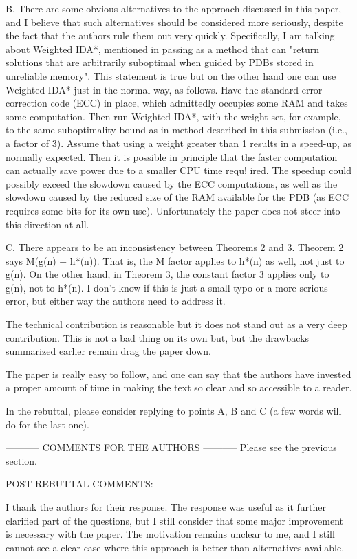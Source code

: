 B. There are some obvious alternatives to the approach discussed in this paper, and I believe that such alternatives should be considered more seriously, despite the fact that the authors rule them out very quickly. Specifically, I am talking about Weighted IDA*, mentioned in passing as a method that can "return solutions that are arbitrarily suboptimal when guided by PDBs stored in unreliable memory". This statement is true but on the other hand one can use Weighted IDA* just in the normal way, as follows. Have the standard error-correction code (ECC) in place, which admittedly occupies some RAM and takes some computation. Then run Weighted IDA*, with the weight set, for example, to the same suboptimality bound as in method described in this submission (i.e., a factor of 3). Assume that using a weight greater than 1 results in a speed-up, as normally expected. Then it is possible in principle that the faster computation can actually save power due to a smaller CPU time requ!
 ired. The speedup could possibly exceed the slowdown caused by the ECC computations, as well as the slowdown caused by the reduced size of the RAM available for the PDB (as ECC requires some bits for its own use). Unfortunately the paper does not steer into this direction at all.

C. There appears to be an inconsistency between Theorems 2 and 3. Theorem 2 says M(g(n) + h*(n)). That is, the M factor applies to h*(n) as well, not just to g(n). On the other hand, in Theorem 3, the constant factor 3 applies only to g(n), not to h*(n). I don't know if this is just a small typo or a more serious error, but either way the authors need to address it.

The technical contribution is reasonable but it does not stand out as a very deep contribution. This is not a bad thing on its own but, but the drawbacks summarized earlier remain drag the paper down.

The paper is really easy to follow, and one can say that the authors have invested a proper amount of time in making the text so clear and so accessible to a reader.

In the rebuttal, please consider replying to points A, B and C (a few words will do for the last one).

----------- COMMENTS FOR THE AUTHORS -----------
Please see the previous section.

POST REBUTTAL COMMENTS:

I thank the authors for their response. The response was useful as it further clarified part of the questions, but I still consider that some major improvement is necessary with the paper. The motivation remains unclear to me, and I still cannot see a clear case where this approach is better than alternatives available.

